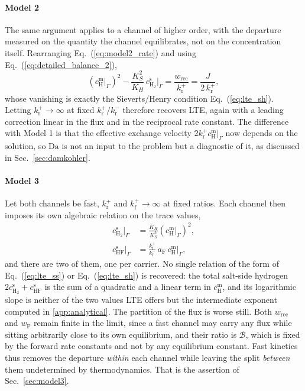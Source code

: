 \documentclass[5p]{elsarticle}
\newcommand{\Da}{\mathrm{Da}}
\newcommand{\cm}[1]{c^{\mathrm{m}}_{#1}}   %
\newcommand{\cs}[1]{c^{\mathrm{s}}_{#1}}   %
\newcommand{\Bra}{\mathcal{B}}             %
\begin{document}
\paragraph{Model 2} The same argument applies to a channel of higher order, with the departure measured on the quantity the channel equilibrates, not on the concentration itself.
Rearranging Eq.~(\ref{eq:model2_rate}) and using Eq.~(\ref{eq:detailed_balance_2}),
\begin{equation}
    \left(\cm{\mathrm{H}}\big|_\Gamma\right)^{2}
    - \frac{K_S^{2}}{K_H}\,\cs{\mathrm{H_2}}\big|_\Gamma
    = \frac{w_\mathrm{rec}}{k_\mathrm{r}^{+}}
    = \frac{J}{2\,k_\mathrm{r}^{+}} ,
    \label{eq:defect_2}
\end{equation}
whose vanishing is exactly the Sieverts/Henry condition Eq.~(\ref{eq:lte_sh}).
Letting $k_\mathrm{r}^{+} \rightarrow \infty$ at fixed $k_\mathrm{r}^{+}/k_\mathrm{r}^{-}$ therefore recovers LTE, again with a leading correction linear in the flux and in the reciprocal rate constant.
The difference with Model 1 is that the effective exchange velocity $2k_\mathrm{r}^{+}\cm{\mathrm{H}}|_\Gamma$ now depends on the solution, so $\Da$ is not an input to the problem but a diagnostic of it, as discussed in Sec.~\ref{sec:damkohler}.

\paragraph{Model 3} Let both channels be fast, $k_\mathrm{r}^{+}$ and $k_\mathrm{f}^{+} \rightarrow \infty$ at fixed ratios.
Each channel then imposes its own algebraic relation on the trace values,
\begin{equation}
    \begin{aligned}
        \cs{\mathrm{H_2}}\big|_\Gamma
            &= \frac{K_H}{K_S^{2}}
               \left(\cm{\mathrm{H}}\big|_\Gamma\right)^{2} , \\[3pt]
        \cs{\mathrm{HF}}\big|_\Gamma
            &= \frac{k_\mathrm{f}^{+}}{k_\mathrm{f}^{-}}\,
               a_\mathrm{F}\,\cm{\mathrm{H}}\big|_\Gamma ,
    \end{aligned}
    \label{eq:model3_fast}
\end{equation}
and there are two of them, one per carrier.
No single relation of the form of Eq.~(\ref{eq:lte_ss}) or Eq.~(\ref{eq:lte_sh}) is recovered: the total salt-side hydrogen $2\cs{\mathrm{H_2}} + \cs{\mathrm{HF}}$ is the sum of a quadratic and a linear term in $\cm{\mathrm{H}}$, and its logarithmic slope is neither of the two values LTE offers but the intermediate exponent computed in \ref{app:analytical}.
The partition of the flux is worse still.
Both $w_\mathrm{rec}$ and $w_\mathrm{F}$ remain finite in the limit, since a fast channel may carry any flux while sitting arbitrarily close to its own equilibrium, and their ratio is $\Bra$, which is fixed by the forward rate constants and not by any equilibrium constant.
Fast kinetics thus removes the departure \emph{within} each channel while leaving the split \emph{between} them undetermined by thermodynamics.
That is the assertion of Sec.~\ref{sec:model3}.
\end{document}
